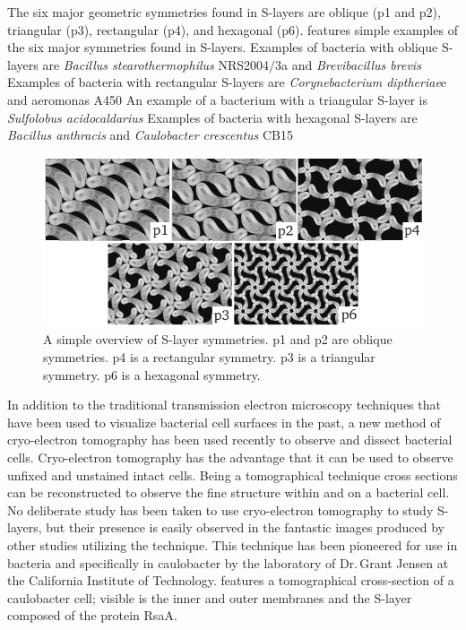The six major geometric symmetries found in
\acp{S-layer} are oblique (p1 and p2), triangular (p3), rectangular (p4), and hexagonal
(p6).   features simple examples of the six major
symmetries found in \acp{S-layer}.  Examples of bacteria with oblique \acp{S-layer} are
\textit{Bacillus stearothermophilus} NRS2004$/$3a and
\textit{Brevibacillus brevis} Examples of bacteria with rectangular
\acp{S-layer} are \textit{Corynebacterium
  diptheriae}e and \acl{aeromonas}
A450 An example of a bacterium with a
triangular \ac{S-layer} is \textit{Sulfolobus acidocaldarius} Examples
of bacteria with hexagonal \acp{S-layer} are \textit{Bacillus anthracis}
and \textit{Caulobacter crescentus} CB15

\begin{figure}[htb] %
  \begin{center}
    \includegraphics[]{intro/img/symmetries.pdf}
  \end{center}
  \caption[A simple overview of \ac{S-layer} symmetries]{A simple overview of \ac{S-layer}
    symmetries. p1 and p2 are oblique symmetries.  p4 is a rectangular symmetry.  p3 is a triangular
    symmetry.  p6 is a hexagonal symmetry.}
  \label{fig:symmetries}
\end{figure}
   
In addition to the traditional transmission electron microscopy techniques that have been used to
visualize bacterial cell surfaces in the past, a new method of cryo-electron tomography has been
used recently to observe and dissect bacterial cells. Cryo-electron tomography has the advantage
that it can be used to observe unfixed and unstained intact cells. Being a tomographical technique cross
sections can be reconstructed to observe the fine structure within and on a bacterial cell. No
deliberate study has been taken to use cryo-electron tomography to study \acp{S-layer}, but their
presence is easily observed in the fantastic images produced by other studies utilizing the
technique. This technique has been pioneered for use in bacteria and specifically in \ac{caulobacter} by the laboratory of Dr.\,Grant Jensen at the California Institute of Technology.   features a tomographical cross-section of a \ac{caulobacter} cell; visible is the inner and outer membranes and the \ac{S-layer} composed of the protein RsaA.

